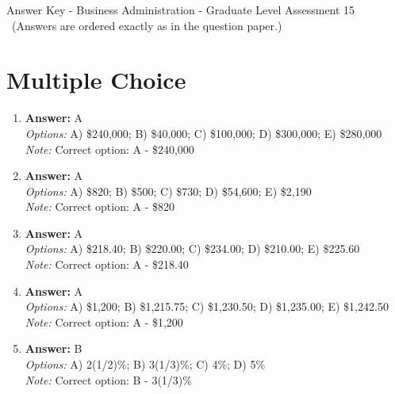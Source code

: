 \documentclass[12pt]{article}
\begin{document}
\begin{center}
Answer Key - Business Administration - Graduate Level Assessment 15 \
\small (Answers are ordered exactly as in the question paper.)
\end{center}

\section*{Multiple Choice}
\begin{enumerate}[label=\arabic*.]
\item \textbf{Answer:} A
\\ \textit{Options:} A) \$240,000; B) \$40,000; C) \$100,000; D) \$300,000; E) \$280,000
\\ \textit{Note:} Correct option: A - \$240,000
\item \textbf{Answer:} A
\\ \textit{Options:} A) \$820; B) \$500; C) \$730; D) \$54,600; E) \$2,190
\\ \textit{Note:} Correct option: A - \$820
\item \textbf{Answer:} A
\\ \textit{Options:} A) \$218.40; B) \$220.00; C) \$234.00; D) \$210.00; E) \$225.60
\\ \textit{Note:} Correct option: A - \$218.40
\item \textbf{Answer:} A
\\ \textit{Options:} A) \$1,200; B) \$1,215.75; C) \$1,230.50; D) \$1,235.00; E) \$1,242.50
\\ \textit{Note:} Correct option: A - \$1,200
\item \textbf{Answer:} B
\\ \textit{Options:} A) 2(1/2)\%; B) 3(1/3)\%; C) 4\%; D) 5\%
\\ \textit{Note:} Correct option: B - 3(1/3)\%
\end{enumerate}
\end{document}
